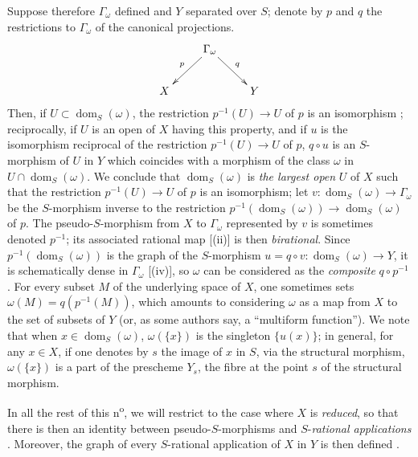 \begin{env}[20.4.2]
\label{IV.20.4.2}
Suppose therefore $\Gamma_\omega$ defined and $Y$ separated over $S$;
denote by $p$ and $q$ the restrictions to $\Gamma_\omega$ of the canonical projections.
\[
  \xymatrix{
  & \Gamma_\omega \ar[dl]_p \ar[dr]^q & \\
  X & & Y
  }
\]
Then, if $U\subset\operatorname{dom}_S(\omega)$, the restriction $p^{-1}(U)\to U$ of $p$ is an isomorphism ;
reciprocally, if $U$ is an open of $X$ having this property, and if $u$ is the isomorphism reciprocal of the restriction $p^{-1}(U)\to U$ of $p$, $q\circ u$ is an $S$-morphism of $U$ in $Y$ which coincides with a morphism of the class $\omega$ in $U\cap\operatorname{dom}_S(\omega)$.
We conclude that $\operatorname{dom}_S(\omega)$ is \emph{the largest open} $U$ of $X$ such that the restriction $p^{-1}(U)\to U$ of $p$ is an
isomorphism;
let $v:\operatorname{dom}_S(\omega)\to\Gamma_\omega$ be the $S$-morphism inverse to the restriction $p^{-1}(\operatorname{dom}_S(\omega))\to\operatorname{dom}_S(\omega)$ of $p$.
The pseudo-$S$-morphism from $X$ to $\Gamma_\omega$ represented by $v$ is sometimes denoted $p^{-1}$; its associated rational map [(ii)] is then \emph{birational}.
Since $p^{-1}(\operatorname{dom}_S(\omega))$ is the graph of the $S$-morphism $u=q\circ v:\operatorname{dom}_S(\omega)\to Y$, it is schematically dense in $\Gamma_\omega$ [(iv)], so $\omega$ can be considered as the \emph{composite} $q\circ p^{-1}$ .
For every subset $M$ of the underlying space of $X$, one sometimes sets $\omega(M)=q(p^{-1}(M))$, which amounts to considering $\omega$ as a map from $X$ to the set of subsets of $Y$ (or, as some authors say, a ``multiform function'').
We note that when $x\in\operatorname{dom}_S(\omega)$, $\omega(\{x\})$ is the singleton $\{u(x)\}$;
in general, for any $x\in X$, if one denotes by $s$ the image of $x$ in $S$, via the structural morphism, $\omega(\{x\})$ is a part of the prescheme $Y_s$, the fibre at the point $s$ of the structural morphism.
\end{env}

\begin{env}[20.4.3]
\label{IV.20.4.3}
In all the rest of this n\textsuperscript{o}, we will restrict to the case where $X$ is \emph{reduced}, so that there is then an identity between pseudo-$S$-morphisms and $S$-\emph{rational applications} .
Moreover, the graph of every $S$-rational application of $X$ in $Y$ is then defined .
\end{env}

